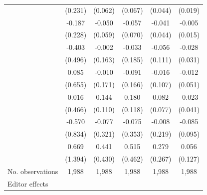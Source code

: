 \begin{table}
\begin{threeparttable}
\begin{tabular}{p{3cm}S@{}S@{}S@{}S@{}S@{}}
                                          &     {(0.231)}   &     {(0.062)}   &     {(0.067)}   &     {(0.044)}   &     {(0.019)}   \\
            &      -0.187   &      -0.050   &      -0.057   &      -0.041   &      -0.005   \\
                                          &     {(0.228)}   &     {(0.059)}   &     {(0.070)}   &     {(0.044)}   &     {(0.015)}   \\
                &      -0.403   &      -0.002   &      -0.033   &      -0.056   &      -0.028   \\
                                          &     {(0.496)}   &     {(0.163)}   &     {(0.185)}   &     {(0.111)}   &     {(0.031)}   \\
                        &       0.085   &      -0.010   &      -0.091   &      -0.016   &      -0.012   \\
                                          &     {(0.655)}   &     {(0.171)}   &     {(0.166)}   &     {(0.107)}   &     {(0.051)}   \\
                     &       0.016   &       0.144   &       0.180   &       0.082   &      -0.023   \\
                                          &     {(0.466)}   &     {(0.110)}   &     {(0.118)}   &     {(0.077)}   &     {(0.041)}   \\
                         &      -0.570   &      -0.077   &      -0.075   &      -0.008   &      -0.085   \\
                                          &     {(0.834)}   &     {(0.321)}   &     {(0.353)}   &     {(0.219)}   &     {(0.095)}   \\
                      &       0.669   &       0.441   &       0.515   &       0.279   &       0.056   \\
                                          &     {(1.394)}   &     {(0.430)}   &     {(0.462)}   &     {(0.267)}   &     {(0.127)}   \\
            \midrule
            No. observations              &       1,988   &       1,988   &       1,988   &       1,988   &       1,988   \\
            \midrule
            Editor effects        &           {}   &           {}   &           {}   &           {}   &           {}   \\

\end{tabular}
\end{threeparttable}
\end{table}
